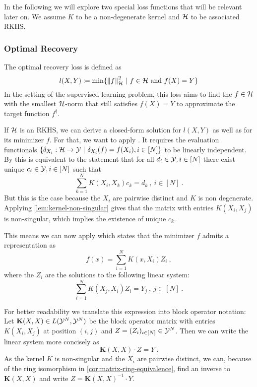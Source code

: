 In the following we will explore two special loss functions that will be relevant later on.
We assume $K$ to be a non-degenerate kernel and $\mathcal{H}$ to be associated RKHS.

\subsubsection{Optimal Recovery}
\label{sec:optimal-recovery}

The optimal recovery loss is defined as
\begin{equation}
\label{eq:optimal-recovery-loss}
l(X, Y) \coloneqq \min\{\norm{f}_{\mathcal{H}}^2 ~|~ f\in \mathcal{H} \text{~and~} f(X) = Y\}
\end{equation}
In the setting of the supervised learning problem, this loss aims to find the $f \in \mathcal{H}$ with the smallest $\mathcal{H}$-norm that still satisfies $f(X) = Y$ to approximate the target function $f^\dagger$.

If $\mathcal{H}$ is an RKHS, we can derive a closed-form solution for $l(X, Y)$ as well as for its minimizer $f$.
For that, we want to apply \cite[Theorem 3.1]{micchelli05}.
It requires the evaluation functionals $\{\delta_{X_i}: \cH \rightarrow \cY \ |\ \delta_{X_i}(f) = f(X_i), i \in [N]\}$ to be linearly independent.
By \cite[Lemma 3.1]{micchelli05} this is equivalent to the statement that for all $d_i \in \mathcal{Y}, i \in [N]$ there exist unique $c_i \in \mathcal{Y}, i \in [N]$ such that
\begin{equation}
	\sum_{k=1}^N K(X_i, X_k) c_k = d_k \ ,\ i \in [N] \ .
\end{equation}
But this is the case because the $X_i$ are pairwise distinct and $K$ is non degenerate.
Applying \cref{lem:kernel-non-singular} gives that the matrix with entries $K(X_i, X_j)$ is non-singular, which implies the existence of unique $c_k$.

This means we can now apply \cite[Theorem 3.1]{micchelli05} which states that the minimizer $f$ admits a representation as 
\begin{equation}
	\label{eq:optimal-recovery-f}
	f(x) = \sum_{i=1}^N K(x, X_i) Z_i \ ,
\end{equation}
where the $Z_i$ are the solutions to the following linear system:
\begin{equation}
	\sum_{i=1}^{N} K(X_j, X_i) Z_i = Y_j \ ,\ j \in [N] \ .
\end{equation}

For better readability we translate this expression into block operator notation:
Let $\mathbf{K}(X, X) \in L(\mathcal{Y}^N, \mathcal{Y}^N)$ be the block operator matrix with entries $K(X_i, X_j)$ at position $(i, j)$ and $Z = (Z_i)_{i \in [N]} \in \mathcal{Y}^N$.
Then we can write the linear system more concisely as 
\begin{equation}
	\mathbf{K}(X, X) \cdot Z = Y \ .
\end{equation}
As the kernel $K$ is non-singular and the $X_i$ are pairwise distinct, we can, because of the ring isomorphism in \cref{cor:matrix-ring-equivalence}, find an inverse to $\mathbf{K}(X, X)$ and write $Z = \mathbf{K}(X, X)^{-1} \cdot Y$.

